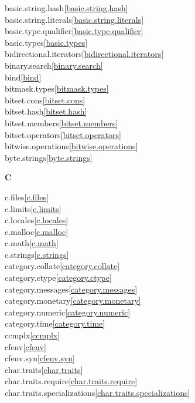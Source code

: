 \begin{multicols}{2}
basic.string.hash\quad\ref{basic.string.hash}\\
basic.string.literals\quad\ref{basic.string.literals}\\
basic.type.qualifier\quad\ref{basic.type.qualifier}\\
basic.types\quad\ref{basic.types}\\
bidirectional.iterators\quad\ref{bidirectional.iterators}\\
binary.search\quad\ref{binary.search}\\
bind\quad\ref{bind}\\
bitmask.types\quad\ref{bitmask.types}\\
bitset.cons\quad\ref{bitset.cons}\\
bitset.hash\quad\ref{bitset.hash}\\
bitset.members\quad\ref{bitset.members}\\
bitset.operators\quad\ref{bitset.operators}\\
bitwise.operations\quad\ref{bitwise.operations}\\
byte.strings\quad\ref{byte.strings}\\
\par \textbf{C}\par
c.files\quad\ref{c.files}\\
c.limits\quad\ref{c.limits}\\
c.locales\quad\ref{c.locales}\\
c.malloc\quad\ref{c.malloc}\\
c.math\quad\ref{c.math}\\
c.strings\quad\ref{c.strings}\\
category.collate\quad\ref{category.collate}\\
category.ctype\quad\ref{category.ctype}\\
category.messages\quad\ref{category.messages}\\
category.monetary\quad\ref{category.monetary}\\
category.numeric\quad\ref{category.numeric}\\
category.time\quad\ref{category.time}\\
ccmplx\quad\ref{ccmplx}\\
cfenv\quad\ref{cfenv}\\
cfenv.syn\quad\ref{cfenv.syn}\\
char.traits\quad\ref{char.traits}\\
char.traits.require\quad\ref{char.traits.require}\\
char.traits.specializations\quad\ref{char.traits.specializations}\\

\end{multicols}
